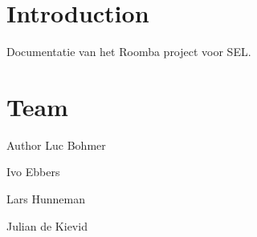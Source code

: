 \hypertarget{index_intro_sec}{}\section{Introduction}\label{index_intro_sec}
Documentatie van het Roomba project voor S\+EL.\hypertarget{index_team_sec}{}\section{Team}\label{index_team_sec}
\begin{DoxyAuthor}{Author}
Luc Bohmer 

Ivo Ebbers 

Lars Hunneman 

Julian de Kievid 
\end{DoxyAuthor}
